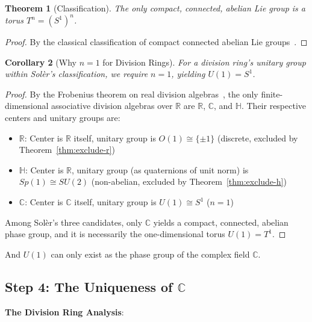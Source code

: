 \documentclass[11pt]{article}
\newtheorem{theorem}{Theorem}[section]
\newtheorem{corollary}[theorem]{Corollary}
\begin{document}
\begin{theorem}[Classification]\label{thm:classification}
The only compact, connected, abelian Lie group is a torus $T^n = (S^1)^n$.
\end{theorem}

\begin{proof}
By the classical classification of compact connected abelian Lie groups~\cite{Hochschild1965}.
\end{proof}

\begin{corollary}[Why $n=1$ for Division Rings]\label{cor:n-equals-1}
For a division ring's unitary group within Sol\`{e}r's classification, we require $n=1$, yielding $U(1) = S^1$.
\end{corollary}

\begin{proof}
By the Frobenius theorem on real division algebras~\cite{Baez2002}, the only finite-dimensional associative division algebras over $\mathbb{R}$ are $\mathbb{R}$, $\mathbb{C}$, and $\mathbb{H}$. Their respective centers and unitary groups are:

\begin{itemize}
\item $\mathbb{R}$: Center is $\mathbb{R}$ itself, unitary group is $O(1) \cong \{\pm 1\}$ (discrete, excluded by Theorem~\ref{thm:exclude-r})
\item $\mathbb{H}$: Center is $\mathbb{R}$, unitary group (as quaternions of unit norm) is $Sp(1) \cong SU(2)$ (non-abelian, excluded by Theorem~\ref{thm:exclude-h})
\item $\mathbb{C}$: Center is $\mathbb{C}$ itself, unitary group is $U(1) \cong S^1$ ($n=1$)
\end{itemize}

Among Sol\`{e}r's three candidates, only $\mathbb{C}$ yields a compact, connected, abelian phase group, and it is necessarily the one-dimensional torus $U(1) = T^1$.
\end{proof}

And $U(1)$ can only exist as the phase group of the complex field $\mathbb{C}$.

\subsection{Step 4: The Uniqueness of $\mathbb{C}$}
\label{step-4-uniqueness}

\textbf{The Division Ring Analysis}:
\end{document}
